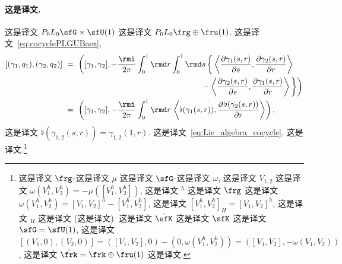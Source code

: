 \documentclass[
    affil-it, %
    auth-lg, %
    british, %
    compression, %
    contents, %
    custom-packages={}, %
    references={bigone}, %
]{lib/preprint}
\newcommand{\boundary}{\flat}
\begin{document}
\begin{body}
        \paragraph{这是译文.}
 这是译文 $P_0L_0\sfG\times\sfU(1)$ 这是译文 $P_0L_0\frg\oplus\fru(1)$. 这是译文~\eqref{eq:cocyclePLGUBaez},         \begin{equation}\label{eq:P0L0G+R_commutator}
            \begin{aligned}
            [(\gamma_1,q_1),(\gamma_2,q_2)]\ &=\ \bigg([\gamma_1,\gamma_2],-\frac{\rmi}{2\pi}\int_0^1\rmd r\int_0^1\rmd s\,\bigg\{\innerLarge{\parder[\gamma_1(s,r)]{s}}{\parder[\gamma_2(s,r)]{r}}
            \\
            &\kern6cm -\innerLarge{\parder[\gamma_2(s,r)]{s}}{\parder[\gamma_1(s,r)]{r}}\bigg\}\bigg)
            \\
            &=\ \left([\gamma_1,\gamma_2],-\frac{\rmi}{2\pi}\int_0^1\rmd    r\,\innerLarge{\boundary(\gamma_1(s,r))}{\parder[\,\boundary(\gamma_2(s,r))]{r}}\right),
        \end{aligned}
        \end{equation}  这是译文 $\boundary(\gamma_{1,2}(s,r))=\gamma_{1,2}(1,r)$. 这是译文~\eqref{eq:Lie_algebra_cocycle}, 这是译文.\footnote{这是译文 $\frg$-这是译文 $\mu$ 这是译文 $\sfG$-这是译文 $\omega$, 这是译文 $V_{1,2}$ 这是译文 $\omega(V_1^h,V_2^h)=-\mu([V_1^h,V_2^h])$, 这是译文 ${}^h$ 这是译文 $\frg$ 这是译文 $\omega(V_1^h,V_2^h)=[V_1,V_2]^h-[V_1^h,V_2^h]$, 这是译文 $[V_1^h,V_2^h]_H=[V_1,V_2]^h$, 这是译文 ${}_H$ 这是译文 (这是译文). 这是译文 $\hat\sfK$ 这是译文 $\sfK$ 这是译文 $\sfG=\sfU(1)$, 这是译文 $[(V_1,0),(V_2,0)]=([V_1,V_2],0)-(0,\omega(V_1^h,V_2^h))=([V_1,V_2],-\omega(V_1,V_2))$, 这是译文 $\hat\frk=\frk\oplus\fru(1)$ 这是译文.}
        

\end{body}
\end{document}
